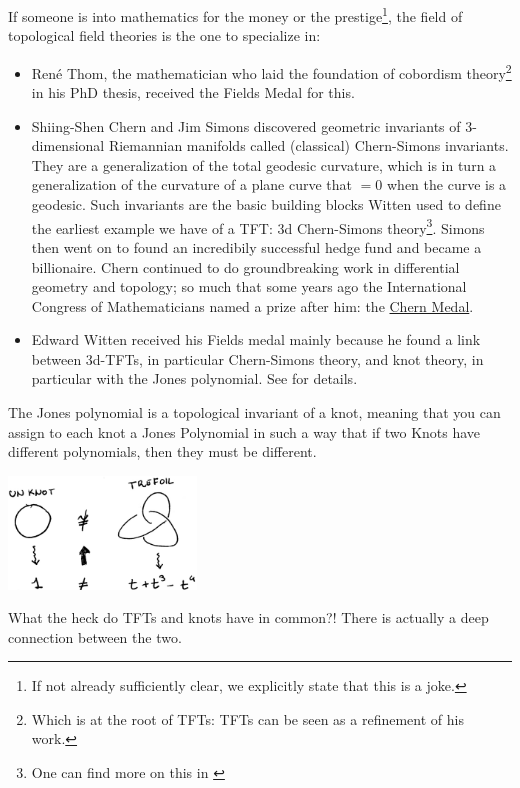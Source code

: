 If someone is into mathematics for the money or the prestige\footnote{If not already sufficiently clear, we explicitly state that this is a joke.}, the field of topological field theories is the one to specialize in:
 \begin{itemize}
    \item René Thom, the mathematician who laid the foundation of cobordism theory\footnote{Which is at the root of TFTs: TFTs can be seen as a refinement of his work.} in his PhD thesis, received the Fields Medal for this.
    
    \item Shiing-Shen Chern and Jim Simons discovered geometric invariants of 3-dimensional Riemannian manifolds called (classical) Chern-Simons invariants. They are a generalization of the total geodesic curvature, which is in turn a generalization of the curvature of a plane curve that $=0$ when the curve is a geodesic. Such invariants are the basic building blocks Witten used to define the earliest example we have of a TFT: 3d Chern-Simons theory\footnote{One can find more on this in \cite{freed2008remarks}}. Simons  then went on to found an incredibily successful hedge fund and became a billionaire. Chern continued to do groundbreaking work in differential geometry and topology; so much that some years ago the International Congress of Mathematicians named a prize after him: the \hyperlink{https://en.wikipedia.org/wiki/Chern_Medal}{Chern Medal}.
    \item Edward Witten received his Fields medal mainly because he found a link between 3d-TFTs, in particular Chern-Simons theory, and knot theory, in particular with the Jones polynomial. See \cite{Witten1989} for details.
\end{itemize} 
The Jones polynomial is a topological invariant of a knot, meaning that you can assign to each knot a Jones Polynomial in such a way that if two Knots have different polynomials, then they must be different.
\begin{center}
\includegraphics[width=5cm]{images/Lecture 1/Jones.jpg}
\end{center}
What the heck do TFTs and knots have in common?! There is actually a deep connection between the two.
